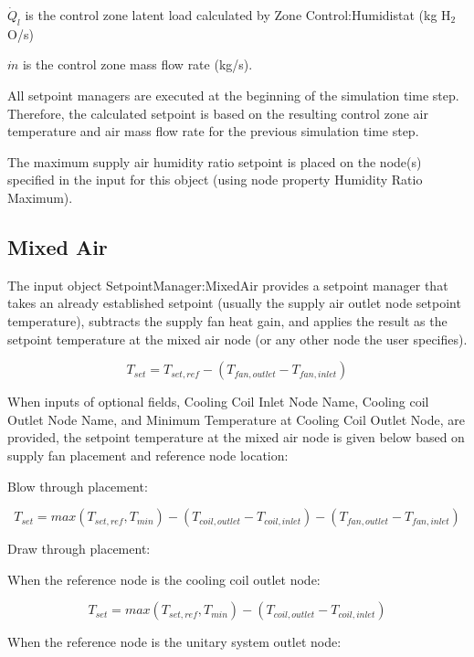 \({\dot{Q}_l}\) is the control zone latent load calculated by Zone Control:Humidistat (kg H\(_{2}\)O/s)

\({\dot{m}}\) is the control zone mass flow rate (kg/s).

All setpoint managers are executed at the beginning of the simulation time step. Therefore, the calculated setpoint is based on the resulting control zone air temperature and air mass flow rate for the previous simulation time step.

The maximum supply air humidity ratio setpoint is placed on the node(s) specified in the input for this object (using node property Humidity Ratio Maximum).

\subsection{Mixed Air}\label{mixed-air}

The input object SetpointManager:MixedAir provides a setpoint manager that takes an already established setpoint (usually the supply air outlet node setpoint temperature), subtracts the supply fan heat gain, and applies the result as the setpoint temperature at the mixed air node (or any other node the user specifies).

\begin{equation}
{T_{set}} = {T_{set,ref}} - ({T_{fan,outlet}} - {T_{fan,inlet}})
\end{equation}

When inputs of optional fields, Cooling Coil Inlet Node Name, Cooling coil Outlet Node Name, and Minimum Temperature at Cooling Coil Outlet Node, are provided, the setpoint temperature at the mixed air node is given below based on supply fan placement and reference node location:

Blow through placement:

\begin{equation}
{T_{set}} = max(T_{set,ref}, T_{min}) - ({T_{coil,outlet}} - {T_{coil,inlet}}) - ({T_{fan,outlet}} - {T_{fan,inlet}})
\end{equation}

Draw through placement:

When the reference node is the cooling coil outlet node:

\begin{equation}
{T_{set}} = max(T_{set,ref}, T_{min}) - ({T_{coil,outlet}} - {T_{coil,inlet}})
\end{equation}

When the reference node is the unitary system outlet node:

